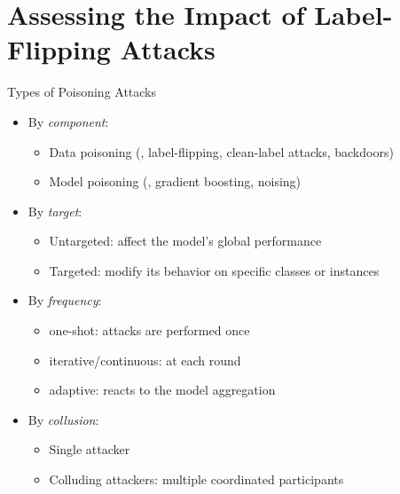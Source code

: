 

\section{Assessing the Impact of Label-Flipping Attacks}

\begin{frame}
  \sectionpage

\end{frame}



\begin{frame}{Types of Poisoning Attacks}
  \begin{itemize}
    \item By \emph{component}:
    \begin{itemize}
      \item Data poisoning (\eg, \alert<5>{label-flipping}, clean-label attacks, backdoors)
      \item Model poisoning (\eg, gradient boosting, noising)
    \end{itemize}\emph{}

    \pause
    \item By \emph{target}:
    \begin{itemize}
      \item \alert<5>{Untargeted}: affect the model's global performance
      \item \alert<5>{Targeted}: modify its behavior on specific classes or instances
    \end{itemize}

    \pause
    \item By \emph{frequency}:
    \begin{itemize}
      \item one-shot: attacks are performed once
      \item iterative/\alert<5>{continuous}: at each round
      \item adaptive: reacts to the model aggregation
    \end{itemize}

    \pause
    \item By \emph{collusion}:
    \begin{itemize}
      \item \alert<5>{Single attacker}
      \item \alert<5>{Colluding attackers}: multiple coordinated participants
    \end{itemize}
  \end{itemize}
\end{frame}

